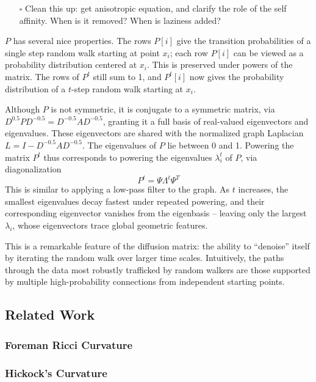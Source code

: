 \documentclass[
  letterpaper,
  DIV=11,
  numbers=noendperiod]{scrartcl}
\providecommand{\tightlist}{%
  \setlength{\itemsep}{0pt}\setlength{\parskip}{0pt}}\usepackage{longtable,booktabs,array}
\begin{document}
\begin{itemize}
\tightlist
\item[$\square$]
  Clean this up: get anisotropic equation, and clarify the role of the
  self affinity. When is it removed? When is laziness added?
\end{itemize}

\(P\) has several nice properties. The rows \(P[i]\) give the transition
probabilities of a single step random walk starting at point \(x_{i}\);
each row \(P[i]\) can be viewed as a probability distribution centered
at \(x_{i}\). This is preserved under powers of the matrix. The rows of
\(P^t\) still sum to 1, and \(P^t[i]\) now gives the probability
distribution of a \(t\)-step random walk starting at \(x_{i}\).

Although \(P\) is not symmetric, it is conjugate to a symmetric matrix,
via \(D^{0.5}PD^{-0.5} = D^{-0.5}AD^{-0.5}\), granting it a full basis
of real-valued eigenvectors and eigenvalues. These eigenvectors are
shared with the normalized graph Laplacian
\(L = I - D^{-0.5}AD^{-0.5}\). The eigenvalues of \(P\) lie between 0
and 1. Powering the matrix \(P^t\) thus corresponds to powering the
eigenvalues \(\lambda_{i}^t\) of \(P\), via diagonalization \[
P^t = \Psi \Lambda^t \Psi^T
\] This is similar to applying a low-pass filter to the graph. As \(t\)
increases, the smallest eigenvalues decay fastest under repeated
powering, and their corresponding eigenvector vanishes from the
eigenbasis -- leaving only the largest \(\lambda_{i}\), whose
eigenvectors trace global geometric features.

This is a remarkable feature of the diffusion matrix: the ability to
``denoise'' itself by iterating the random walk over larger time scales.
Intuitively, the paths through the data most robustly trafficked by
random walkers are those supported by multiple high-probability
connections from independent starting points.

\subsection{Related Work}\label{related-work}

\subsubsection{Foreman Ricci Curvature}\label{foreman-ricci-curvature}

\subsubsection{Hickock's Curvature}\label{hickocks-curvature}
\end{document}
